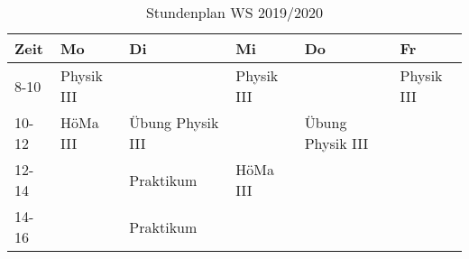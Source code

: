 \documentclass[
  captions=tableheading,
]{scrartcl}
\begin{document}
\renewcommand{\arraystretch}{2}
\begin{table}
\centering
\caption {Stundenplan WS 2019/2020}
    \begin{tabular}{p{2cm} p{2cm} p{2cm} p{2cm} p{2cm} p{2cm}}
    \toprule
    Zeit & Mo & Di & Mi & Do & Fr \\
    \midrule
    8-10 & Physik III & & Physik III & & Physik III \\
    10-12 & HöMa III & Übung Physik III & & Übung Physik III & \\
    12-14 & & Praktikum & HöMa III & & \\
    14-16 & & Praktikum & & & \\
    \bottomrule
    \end{tabular}
\end{table}
\end{document}
